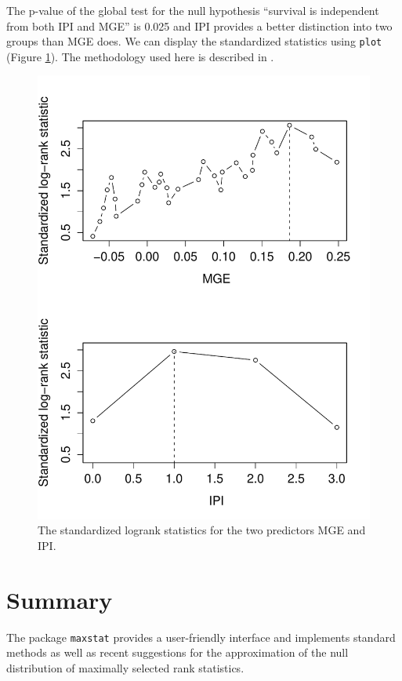 \documentclass{article}
\begin{document}
The p-value of the global test for the null hypothesis ``survival is
independent from both IPI and MGE'' is 0.025 
and IPI provides a better distinction into two groups than 
MGE does. We can display the
standardized statistics using \texttt{plot} (Figure \ref{plotmmax}). The
methodology used here is described in \cite{lausenetal:2002}.

\begin{figure}[ht]
\begin{center}
\includegraphics{maxstat-mmax-fig}
\caption{The standardized logrank statistics for the two predictors MGE and
IPI. \label{plotmmax}}
\end{center}
\end{figure}

\section{Summary}

The package \texttt{maxstat} provides a user-friendly interface and 
implements standard methods as well as recent suggestions for the 
approximation of the null distribution of maximally selected rank statistics.




\end{document}
